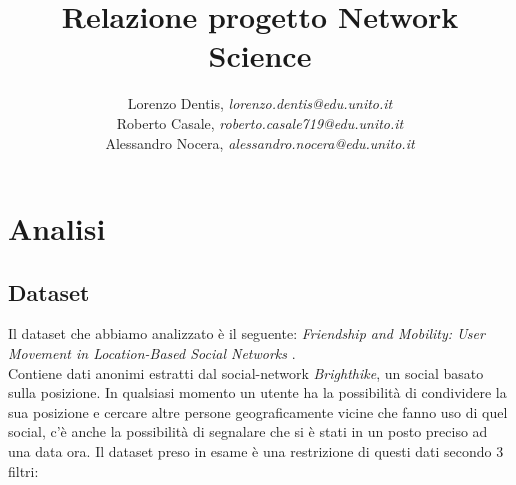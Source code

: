 \documentclass[a4paper]{article}
\begin{document}
\author{
	Lorenzo Dentis, \textit{lorenzo.dentis@edu.unito.it}\\
	Roberto Casale, \textit{roberto.casale719@edu.unito.it}\\
	Alessandro Nocera, \textit{alessandro.nocera@edu.unito.it}
}
\title{Relazione progetto Network Science}
\maketitle

\tableofcontents


\section{Analisi}
\subsection{Dataset}
Il dataset che abbiamo analizzato è il seguente: \textit{ Friendship and Mobility: User Movement in Location-Based Social Networks }\cite{original_paper}.\\
Contiene dati anonimi estratti dal social-network \textit{Brighthike}, un social basato sulla posizione.
In qualsiasi momento un utente ha la possibilità di condividere la sua posizione e cercare altre persone geograficamente vicine che fanno uso di quel social, c'è anche la possibilità di segnalare che si è stati in un posto preciso ad una data ora.
Il dataset preso in esame è una restrizione di questi dati secondo 3 filtri:
\end{document}
